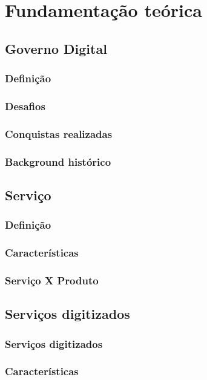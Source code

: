 \chapter[Fundamentação teórica]{Fundamentação teórica}

\section{Governo Digital}
\subsection{Definição}
\subsection{Desafios}
\subsection{Conquistas realizadas}
\subsection{Background histórico}

\section{Serviço}
\subsection{Definição}
\subsection{Características}
\subsection{Serviço X Produto}

\section{Serviços digitizados}
\subsection{Serviços digitizados}
\subsection{Características}

